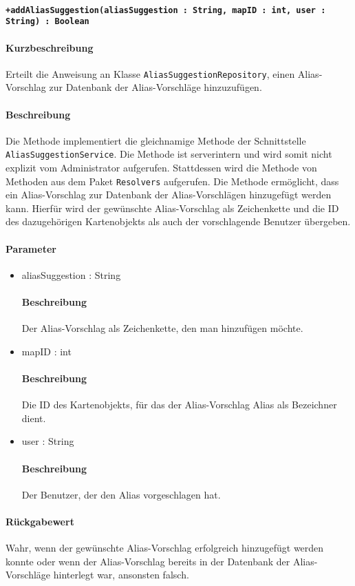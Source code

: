 \paragraph*{\texttt{+addAliasSuggestion(aliasSuggestion : String, mapID : int, user : String) : Boolean}}%
\paragraph*{Kurzbeschreibung}
Erteilt die Anweisung an Klasse \texttt{AliasSuggestionRepository}, einen Alias-Vorschlag zur Datenbank der Alias-Vorschläge hinzuzufügen.
\paragraph*{Beschreibung}
Die Methode implementiert die gleichnamige Methode der Schnittstelle \texttt{AliasSuggestionService}.
Die Methode ist serverintern und wird somit nicht explizit vom Administrator aufgerufen.
Stattdessen wird die Methode von Methoden aus dem Paket \texttt{Resolvers} aufgerufen.
Die Methode ermöglicht, dass ein Alias-Vorschlag zur Datenbank der Alias-Vorschlägen hinzugefügt werden kann.
Hierfür wird der gewünschte Alias-Vorschlag als Zeichenkette und die ID des dazugehörigen Kartenobjekts als auch der vorschlagende Benutzer übergeben.
\paragraph*{Parameter}
\begin{itemize}
    \item aliasSuggestion : String
    		\paragraph*{Beschreibung}
    		Der Alias-Vorschlag als Zeichenkette, den man hinzufügen möchte.
    \item mapID : int
    		\paragraph*{Beschreibung}
    		Die ID des Kartenobjekts, für das der Alias-Vorschlag Alias als Bezeichner dient.
    	\item user : String
    		\paragraph*{Beschreibung}
    		Der Benutzer, der den Alias vorgeschlagen hat.
\end{itemize}
\paragraph*{Rückgabewert}
Wahr, wenn der gewünschte Alias-Vorschlag erfolgreich hinzugefügt werden konnte oder wenn der Alias-Vorschlag bereits in der Datenbank der Alias-Vorschläge hinterlegt war, ansonsten falsch.
